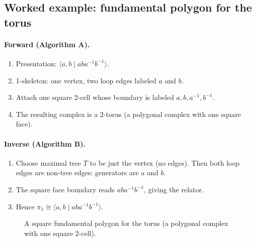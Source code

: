 \documentclass[11pt]{article}
\theoremstyle{definition}
\theoremstyle{plain}
\theoremstyle{remark}
\begin{document}
\subsection*{Worked example: fundamental polygon for the torus}
\paragraph{Forward (Algorithm A).}
\begin{enumerate}[leftmargin=2.2em]
\item Presentation: $\langle a,b\mid aba^{-1}b^{-1}\rangle$.
\item 1-skeleton: one vertex, two loop edges labeled $a$ and $b$.
\item Attach one square 2-cell whose boundary is labeled $a,b,a^{-1},b^{-1}$.
\item The resulting complex is a 2-torus (a polygonal complex with one square face).
\end{enumerate}

\paragraph{Inverse (Algorithm B).}
\begin{enumerate}[leftmargin=2.2em]
\item Choose maximal tree $T$ to be just the vertex (no edges).
Then both loop edges are non-tree edges: generators are $a$ and $b$.
\item The square face boundary reads $aba^{-1}b^{-1}$, giving the relator.
\item Hence $\pi_1\cong \langle a,b\mid aba^{-1}b^{-1}\rangle$.
\end{enumerate}

\begin{figure}[h]
\centering
{}
\caption{A square fundamental polygon for the torus (a polygonal complex with one square 2-cell).}
\end{figure}

\end{document}
